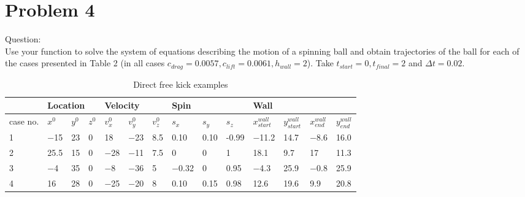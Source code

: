 \documentclass[12pt]{article}
\begin{document}
\newpage
\section{Problem 4}\label{sec::Problem 4}
Question:\\
Use your function to solve the system of equations describing the motion of a spinning ball and
obtain trajectories of the ball for each of the cases presented in Table 2 (in all cases $c_{drag} = 0.0057,
c_{lift} = 0.0061, h_{wall} = 2$). Take $t_{start} = 0, t_{final} = 2$ and $\Delta t = 0.02$.
\begin{table}[bht]
\centering

\begin{tabular}{|l|l|l|l|l|l|l|l|l|l|l|l|l|l|}
\hline
\multicolumn{1}{|r|}{} & \multicolumn{3}{l|}{Location} & \multicolumn{3}{l|}{Velocity} & \multicolumn{3}{l|}{Spin} & \multicolumn{4}{l|}{Wall}                                                     \\ \hline
case no.               & $x^0$    & $y^0$    & $z^0$   & $v_x^0$  & $v_y^0$  & $v_z^0$ & $s_x$   & $s_y$  & $s_z$  & $x_{start}^{wall}$ & $y_{start}^{wall}$ & $x_{end}^{wall}$ & $y_{end}^{wall}$ \\ \hline
1                      & −15      & 23       & 0       & 18       & −23      & 8.5     & 0.10    & 0.10   & -0.99   & −11.2              & 14.7               & −8.6             & 16.0             \\ \hline
2                      & 25.5     & 15       & 0       & −28      & −11      & 7.5     & 0       & 0      & 1      & 18.1               & 9.7                & 17               & 11.3             \\ \hline
3                      & −4       & 35       & 0       & −8       & −36      & 5       & −0.32   & 0      & 0.95   & −4.3               & 25.9               & −0.8             & 25.9             \\ \hline
4                      & 16       & 28       & 0       & −25      & −20      & 8       & 0.10    & 0.15   & 0.98   & 12.6               & 19.6               & 9.9              & 20.8             \\ \hline
\end{tabular}
\caption{Direct free kick examples}
\label{Table 1:}
\end{table}
\end{document}
